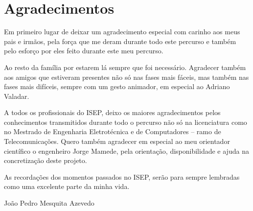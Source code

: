 \chapter*{Agradecimentos}

Em primeiro lugar de deixar um agradecimento especial com carinho aos meus pais e irmãos, pela força que me deram durante todo este percurso e também pelo esforço por eles feito durante este meu percurso.

Ao resto da família por estarem lá sempre que foi necessário.
Agradecer também aos amigos que estiveram presentes não só nas fases mais fáceis, mas também nas fases mais difíceis, sempre com um gesto animador, em especial ao Adriano Valadar.


A todos os profissionais do ISEP, deixo os maiores agradecimentos pelos conhecimentos transmitidos durante todo o percurso não só na licenciatura como no Mestrado de Engenharia Eletrotécnica e de Computadores – ramo de Telecomunicações. 
Quero também agradecer em especial ao meu orientador científico o engenheiro Jorge Mamede, pela orientação, disponibilidade e ajuda na concretização deste projeto.
 
As recordações dos momentos passados no ISEP, serão para sempre lembradas como uma excelente parte da minha vida.


\vspace{10mm}
\begin{flushleft}
João Pedro Mesquita Azevedo
\end{flushleft}
